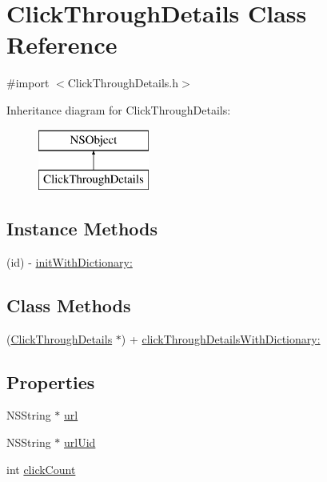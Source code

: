 \hypertarget{interface_click_through_details}{\section{Click\-Through\-Details Class Reference}
\label{interface_click_through_details}
}


{\ttfamily \#import $<$Click\-Through\-Details.\-h$>$}

Inheritance diagram for Click\-Through\-Details\-:\begin{figure}[H]
\begin{center}
\leavevmode
\includegraphics[height=2.000000cm]{interface_click_through_details}
\end{center}
\end{figure}
\subsection*{Instance Methods}
\begin{DoxyCompactItemize}
\item 
(id) -\/ \hyperlink{interface_click_through_details_a5ce3bc6ae727dfb132c7ef1bd9042d0a}{init\-With\-Dictionary\-:}
\end{DoxyCompactItemize}
\subsection*{Class Methods}
\begin{DoxyCompactItemize}
\item 
(\hyperlink{interface_click_through_details}{Click\-Through\-Details} $\ast$) + \hyperlink{interface_click_through_details_aa92aedf2a8f54ded2c9ce27b727e2689}{click\-Through\-Details\-With\-Dictionary\-:}
\end{DoxyCompactItemize}
\subsection*{Properties}
\begin{DoxyCompactItemize}
\item 
N\-S\-String $\ast$ \hyperlink{interface_click_through_details_a3b99fa4774bd8eab8aac29488b59480b}{url}
\item 
N\-S\-String $\ast$ \hyperlink{interface_click_through_details_a872fe75aab72a323e05459998bd703e2}{url\-Uid}
\item 
int \hyperlink{interface_click_through_details_a686f45bf797fa7daedfb6626eddccd3a}{click\-Count}
\end{DoxyCompactItemize}


